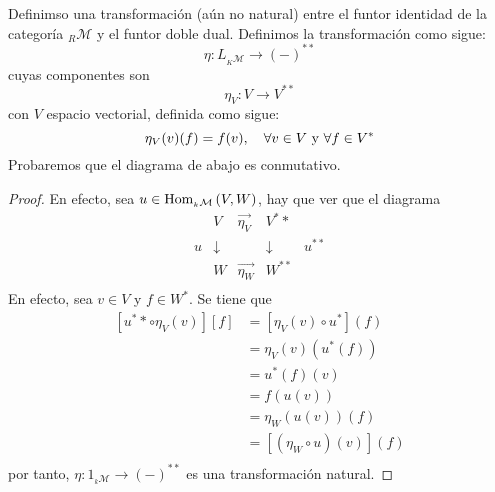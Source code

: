 \documentclass[12pt]{report}
\newcounter{it}
\theoremstyle{largebreak}
\newcommand\cf[3]{\ensuremath{#1:#2\rightarrow#3}}
\newcommand{\Hom}[3]{\ensuremath{\textup{Hom}_{#1}\left(#2,#3\right)}}
\begin{document}
    \begin{exa}
        Definimso una transformación (aún no natural) entre el funtor identidad de la categoría $_R\mathcal{M}$ y el funtor doble dual. Definimos la transformación como sigue:
        \begin{equation*}
            \eta:L_{_K\mathcal{M}}\rightarrow (-)^{ **}
        \end{equation*}
        cuyas componentes son
        \begin{equation*}
            \eta_V:V\rightarrow V^{**}
        \end{equation*}
        con $V$ espacio vectorial, definida como sigue:
        \begin{equation*}
            \eta_V(v)(f)=f(v),\quad\forall v\in V\textup{ y }\forall f\in V^*
        \end{equation*}
        Probaremos que el diagrama de abajo es conmutativo.
    \end{exa}

    \begin{proof}
        En efecto, sea $u\in\Hom{_k\mathcal{M}}{V}{W}$, hay que ver que el diagrama
        \begin{equation*}
            \begin{array}{rcccl}
                &V & \overset{\longrightarrow}{\eta_V} & V^** &\\
                u & \downarrow & & \downarrow & u^{**} \\
                &W & \overset{\longrightarrow}{\eta_W} & W^{**} &\\
            \end{array}
        \end{equation*}
        En efecto, sea $v\in V$ y $f\in W^*$. Se tiene que
        \begin{equation*}
            \begin{split}
                [u^**\circ\eta_V(v)][f]&=[\eta_V(v)\circ u^*](f)\\
                &=\eta_V(v)(u^*(f))\\
                &=u^*(f)(v)\\
                &=f(u(v))\\
                &=\eta_W(u(v))(f)\\
                &=[(\eta_W\circ u)(v)](f)\\
            \end{split}
        \end{equation*}
        por tanto, $\cf{\eta}{1_{_k\mathcal{M}}}{(-)^{**}}$ es una transformación natural.
    \end{proof}
\end{document}
